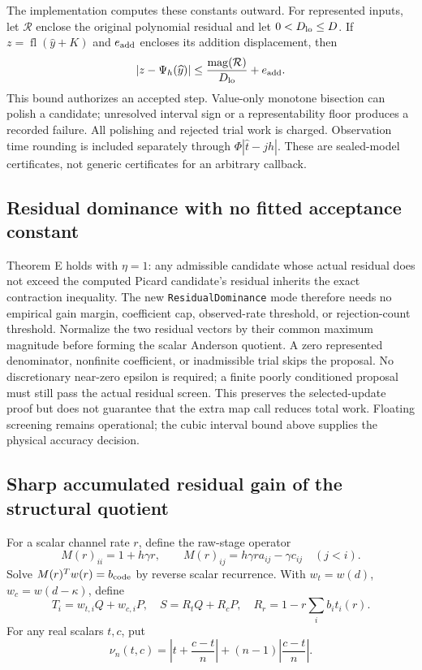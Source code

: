 The implementation computes these constants outward. For represented
inputs, let $\mathcal R$ enclose the original polynomial residual and
let $0<D_{\rm lo}\le D$. If $z=\operatorname{fl}(\widehat y+K)$ and
$e_{\rm add}$ encloses its addition displacement, then
\begin{equation}
 |z-\Psi_h(\widehat y)|\le
 \frac{\operatorname{mag}(\mathcal R)}{D_{\rm lo}}+e_{\rm add}.
\end{equation}
This bound authorizes an accepted step. Value-only monotone bisection can
polish a candidate; unresolved interval sign or a representability floor
produces a recorded failure. All polishing and rejected trial work is
charged. Observation time rounding is included separately through
$\Phi|\widehat t-jh|$. These are sealed-model certificates, not generic
certificates for an arbitrary callback.

\subsection{Residual dominance with no fitted acceptance constant}

Theorem E holds with $\eta=1$: any admissible candidate whose actual
residual does not exceed the computed Picard candidate's residual
inherits the exact contraction inequality. The new
\texttt{ResidualDominance} mode therefore needs no empirical gain margin,
coefficient cap, observed-rate threshold, or rejection-count threshold.
Normalize the two residual vectors by their common maximum magnitude
before forming the scalar Anderson quotient. A zero represented
denominator, nonfinite coefficient, or inadmissible trial skips the
proposal. No discretionary near-zero epsilon is required; a finite
poorly conditioned proposal must still pass the actual residual screen.
This preserves the selected-update proof but does not guarantee that the
extra map call reduces total work. Floating screening remains operational;
the cubic interval bound above supplies the physical accuracy decision.

\subsection{Sharp accumulated residual gain of the structural quotient}

For a scalar channel rate $r$, define the raw-stage operator
\begin{equation}
 M(r)_{ii}=1+h\gamma r,\qquad
 M(r)_{ij}=h\gamma r a_{ij}-\gamma c_{ij}\quad(j<i).
\end{equation}
Solve $M(r)^T w(r)=b_{\rm code}$ by reverse scalar recurrence. With
$w_t=w(d)$, $w_c=w(d-\kappa)$, define
\begin{equation}
 T_i=w_{t,i}Q+w_{c,i}P,\quad S=R_tQ+R_cP,\quad
 R_r=1-r\sum_i b_i t_i(r).
\end{equation}
For any real scalars $t,c$, put
\begin{equation}
 \nu_n(t,c)=\left|t+\frac{c-t}{n}\right|
 +(n-1)\left|\frac{c-t}{n}\right|.
\end{equation}

